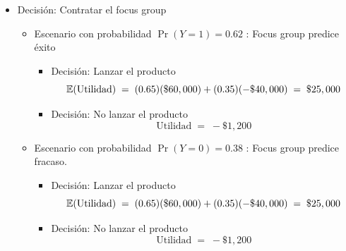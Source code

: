 \documentclass[ a4paper, twoside, 11pt]{article}
\begin{document}
\begin{problem}
\begin{itemize}
\item Decisi\'on: Contratar el focus group
\begin{itemize}

\item Escenario con probabilidad $\Pr(Y=1) = 0.62$ : Focus group predice \'exito
\begin{itemize}
\item Decisi\'on: Lanzar el producto
\[
\mathbb{E}(\text{Utilidad}) \; = \;
(0.65)(\$60,000) + (0.35)(-\$40,000) \; = \;
\$25,000
\]
\item Decisi\'on: No lanzar el producto
\[
\text{Utilidad} \; = \; -\$1,200
\]
\end{itemize}

\item Escenario con probabilidad $\Pr(Y=0) = 0.38$ : Focus group predice fracaso.
\begin{itemize}
\item Decisi\'on: Lanzar el producto
\[
\mathbb{E}(\text{Utilidad}) \; = \;
(0.65)(\$60,000) + (0.35)(-\$40,000) \; = \;
\$25,000
\]
\item Decisi\'on: No lanzar el producto
\[
\text{Utilidad} \; = \; -\$1,200
\]
\end{itemize}
\end{itemize}

\end{itemize}


\end{problem}
\vspace{\baselineskip}
\end{document}
